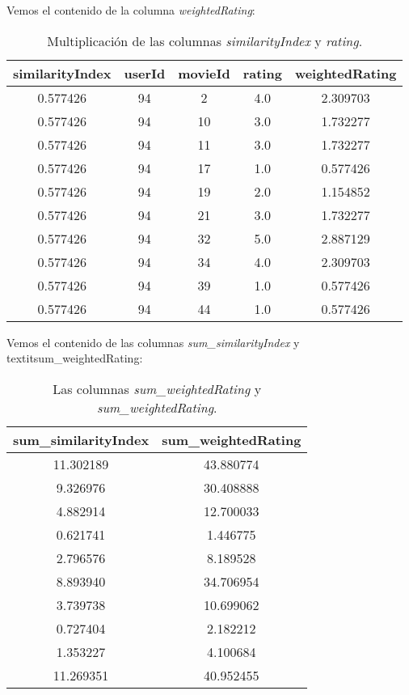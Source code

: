 \documentclass{uimppracticas}
\begin{document}
Vemos el contenido de la columna \textit{weightedRating}:

\begin{table}[H]
	\centering
	\begin{tabular}{ccccc}
		\toprule
		similarityIndex &  userId &  movieId &  rating &  weightedRating \\
		\midrule
		0.577426 &      94 &        2 &     4.0 &        2.309703 \\
		0.577426 &      94 &       10 &     3.0 &        1.732277 \\
		0.577426 &      94 &       11 &     3.0 &        1.732277 \\
		0.577426 &      94 &       17 &     1.0 &        0.577426 \\
		0.577426 &      94 &       19 &     2.0 &        1.154852 \\
		0.577426 &      94 &       21 &     3.0 &        1.732277 \\
		0.577426 &      94 &       32 &     5.0 &        2.887129 \\
		0.577426 &      94 &       34 &     4.0 &        2.309703 \\
		0.577426 &      94 &       39 &     1.0 &        0.577426 \\
		0.577426 &      94 &       44 &     1.0 &        0.577426 \\
		\bottomrule
	\end{tabular}
	\caption{Multiplicación de las columnas \textit{similarityIndex} y \textit{rating}.}
	\label{weightedRating}
\end{table}

\newpage

Vemos el contenido de las columnas \textit{sum\_similarityIndex} y textit{sum\_weightedRating}:

\begin{table}[H]
	\centering
	\begin{tabular}{cc}
		\toprule
		sum\_similarityIndex &  sum\_weightedRating \\
		\midrule
		11.302189 &           43.880774 \\
		9.326976 &           30.408888 \\
		4.882914 &           12.700033 \\
		0.621741 &            1.446775 \\
		2.796576 &            8.189528 \\
		8.893940 &           34.706954 \\
		3.739738 &           10.699062 \\
		0.727404 &            2.182212 \\
		1.353227 &            4.100684 \\
		11.269351 &           40.952455 \\
		\bottomrule
	\end{tabular}
	\caption{Las columnas \textit{sum\_weightedRating} y \textit{sum\_weightedRating}.}
	\label{sums}
\end{table}
\end{document}
